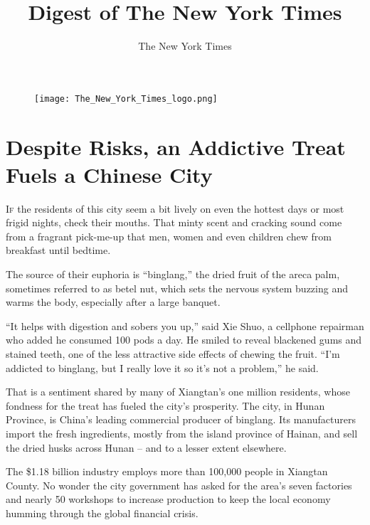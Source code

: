 ﻿\documentclass[12pt]{article}
\title{Digest of The New York Times}
\author{The New York Times}
\begin{document}
\date{}
\thispagestyle{empty}

\begin{figure}
\texttt{[image: The\_New\_York\_Times\_logo.png]}
\vspace{-20ex}
\end{figure}
\renewcommand\contentsname{}
{\footnotesize\textsf{\tableofcontents}}

\clearpage
\setcounter{page}{1}


\section{Despite Risks, an Addictive Treat Fuels a Chinese City}

\lettrine{I}{f} the residents of this city seem a bit lively on even the
hottest days or most frigid nights, check their mouths. That minty scent and cracking sound come
from a fragrant pick-me-up that men, women and even children chew from breakfast until bedtime.

The source of their euphoria is ``binglang,'' the dried fruit of the areca palm, sometimes referred
to as betel nut, which sets the nervous system buzzing and warms the body, especially after a large
banquet.

``It helps with digestion and sobers you up,'' said Xie Shuo, a cellphone repairman who added he
consumed 100 pods a day. He smiled to reveal blackened gums and stained teeth, one of the less
attractive side effects of chewing the fruit. ``I'm addicted to binglang, but I really love it so
it's not a problem,'' he said.

That is a sentiment shared by many of Xiangtan's one million residents, whose fondness for the treat
has fueled the city's prosperity. The city, in Hunan Province, is China's leading commercial
producer of binglang. Its manufacturers import the fresh ingredients, mostly from the island
province of Hainan, and sell the dried husks across Hunan -- and to a lesser extent elsewhere.

The \$1.18 billion industry employs more than 100,000 people in Xiangtan County. No wonder the city
government has asked for the area's seven factories and nearly 50 workshops to increase production
to keep the local economy humming through the global financial crisis.
\end{document}
